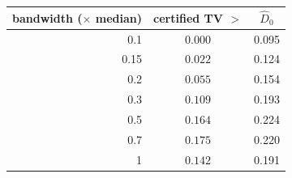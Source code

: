 \begin{tabular}{rcc}
\toprule
bandwidth ($\times$ median) & certified TV $>$ & $\widehat D_0$ \\
\midrule
0.1 & $0.000$ & 0.095 \\
0.15 & $0.022$ & 0.124 \\
0.2 & $0.055$ & 0.154 \\
0.3 & $0.109$ & 0.193 \\
0.5 & $0.164$ & 0.224 \\
0.7 & $0.175$ & 0.220 \\
1 & $0.142$ & 0.191 \\
\bottomrule
\end{tabular}
